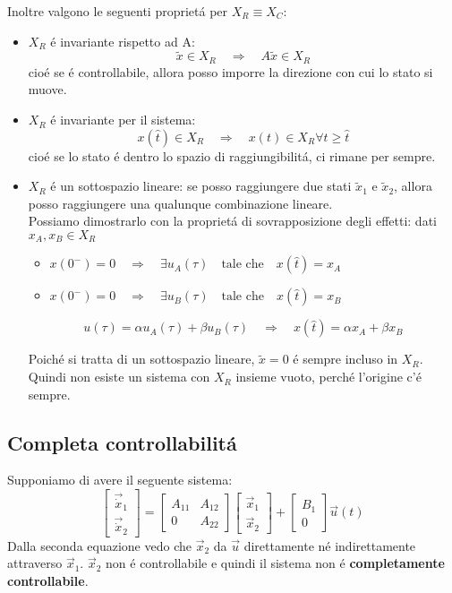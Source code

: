 \documentclass[../main.tex]{subfiles}
\begin{document}
		\noindent
		Inoltre valgono le seguenti propriet\'a per $ X_R \equiv X_C $:
		\begin{itemize}
			\item
				$ X_R $ \'e invariante rispetto ad A:
				\[
					\tilde x \in X_R \quad\Rightarrow\quad A \tilde x \in X_R
				\]
				cio\'e se \'e controllabile, allora posso imporre la direzione con cui lo stato si muove.
			\item
				$ X_R $ \'e invariante per il sistema:
				\[
					x(\hat t) \in X_R \quad\Rightarrow\quad x(t) \in X_R \forall t \geq \hat t
				\]
				cio\'e se lo stato \'e dentro lo spazio di raggiungibilit\'a, ci rimane per sempre.
			\item
				$ X_R $ \'e un sottospazio lineare: se posso raggiungere due stati $ \tilde x_1 $ e $ \tilde x_2 $, allora posso raggiungere una qualunque combinazione lineare.\\
				Possiamo dimostrarlo con la propriet\'a di sovrapposizione degli effetti:
				dati $ x_A, x_B \in X_R $
				\begin{itemize}
					\item 
						$ x(0^-) = 0 \quad\Rightarrow\quad \exists u_A(\tau) \quad\text{tale che}\quad x(\hat t) = x_A $
					\item
						$ x(0^-) = 0 \quad\Rightarrow\quad \exists u_B(\tau) \quad\text{tale che}\quad x(\hat t) = x_B $
				\end{itemize}
				\[ 
					u(\tau) = \alpha u_A(\tau) + \beta u_B(\tau) \quad\Rightarrow\quad x(\hat t) = \alpha x_A + \beta x_B
				\]
				
				Poich\'e si tratta di un sottospazio lineare, $ \tilde x = 0 $ \'e sempre incluso in $ X_R $. Quindi non esiste un sistema con $ X_R $ insieme vuoto, perch\'e l'origine c'\'e sempre.
		\end{itemize}
		
	\subsection{Completa controllabilit\'a}
		Supponiamo di avere il seguente sistema:
		\[
			\begin{bmatrix}
				\vec{\dot x}_1 \\ \vec{\dot x}_2
			\end{bmatrix} = 
			\begin{bmatrix}
				A_{11} & A_{12}\\
				0 & A_{22}
			\end{bmatrix}
			\begin{bmatrix}
				\vec x_1 \\ \vec x_2
			\end{bmatrix} +
			\begin{bmatrix}
				B_1 \\ 0
			\end{bmatrix} \vec u(t)
		\]
		Dalla seconda equazione vedo che $ \vec x_2 $ da $ \vec u $ direttamente n\'e indirettamente attraverso $ \vec x_1 $. $ \vec x_2 $ non \'e controllabile e quindi il sistema non \'e \textbf{completamente controllabile}.
	
\end{document}
